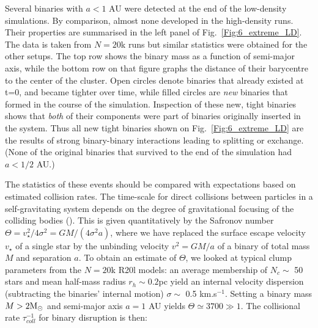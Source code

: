 Several binaries with $a < 1 $ AU were detected at the end of the low-density simulations. By comparison, almost none developed in the high-density runs. Their properties are summarised in the left panel of Fig.~\ref{Fig:6_extreme_LD}. 
The data is taken from $N = 20$k runs but similar statistics were obtained for the other setups. 
The top row shows the binary mass as a function of semi-major axis, while the  bottom row on that figure  graphs the distance of their barycentre to the center of the cluster. Open circles denote binaries that already existed at t=0, and became tighter over time, while filled circles are {\it new} binaries that formed in the course of the simulation. Inspection of these new, tight  binaries shows that {\it both} of their components were part of  binaries originally inserted in the system. Thus all new tight binaries shown on Fig.~\ref{Fig:6_extreme_LD}  are the results of strong binary-binary interactions leading to splitting or exchange. (None of the original  binaries that survived 	to the end of the simulation had  $a < 1/2 $ AU.)
	
 
The statistics of these events should be compared with expectations based on estimated collision rates. 
The  time-scale for direct collisions between  particles in a self-gravitating system  depends on the degree of gravitational focusing of the colliding bodies  (\citealt[section 7.5.8, Eq. 7.195a]{BT}). This is given quantitatively by the Safronov number $\Theta = v_\star^2/4\sigma^2 = G M / (4\sigma^2 a)$, where we have replaced the surface escape velocity $v_\star$ of a single star by the 
unbinding velocity $v^2 = GM/a$ of a binary of total mass $M$ and separation $a$. To obtain an estimate of $\Theta$, 
we looked at typical clump parameters from the $N = 20$k 
R20l models: an average membership of $N_c \sim$ 50 stars and mean half-mass radius $r_{h}\sim 0.2$pc yield  
 an internal velocity dispersion (subtracting the binaries' internal motion) $\sigma \sim$ 0.5 km.s$^{-1}$.
 Setting a binary mass $ M > 2 {\textrm{M}_\odot}$ and semi-major axis $ a = 1 $ AU yields $\Theta \simeq 3 700 \gg 1$. The collisional rate $\tau_{coll}^{-1}$  for binary disruption is then: 

